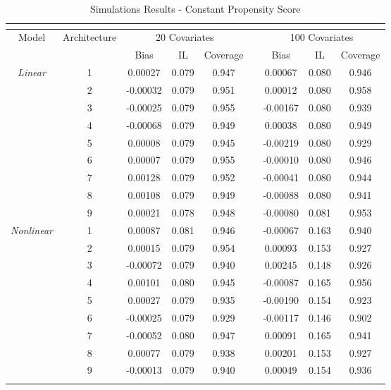 \documentclass[11pt]{article}
\numberwithin{equation}{section}
\theoremstyle{definition}
\begin{document}
\begin{table}[h]
	\begin{centering}
		\caption{Simulations Results - Constant Propensity Score\label{tab:simuls1}}
		~
		\par
	\end{centering}
	\begin{onehalfspace}
		\centering{}%
		\begin{tabular}{ccccccccc}
			\multicolumn{9}{c}{}\tabularnewline
			\hline 
			\hline 
			\multirow{2}{*}{Model} & \multirow{2}{*}{Architecture} & \multicolumn{3}{c}{20 Covariates} &  & \multicolumn{3}{c}{100 Covariates}\tabularnewline
			\cline{3-5} \cline{7-9} 
			 &  & Bias & IL & Coverage &  & Bias & IL & Coverage\tabularnewline
			\hline 
			\multirow{9}{*}{\textit{Linear}}  & 1 & 0.00027 & 0.079 & 0.947 &  & 0.00067 & 0.080 & 0.946\tabularnewline
			 & 2 & -0.00032 & 0.079 & 0.951 &  & 0.00012 & 0.080 & 0.958\tabularnewline
			 & 3 & -0.00025 & 0.079 & 0.955 &  & -0.00167 & 0.080 & 0.939\tabularnewline
			 & 4 & -0.00068 & 0.079 & 0.949 &  & 0.00038 & 0.080 & 0.949\tabularnewline
			 & 5 & 0.00008 & 0.079 & 0.945 &  & -0.00219 & 0.080 & 0.929\tabularnewline
			 & 6 & 0.00007 & 0.079 & 0.955 &  & -0.00010 & 0.080 & 0.946\tabularnewline
			 & 7 & 0.00128 & 0.079 & 0.952 &  & -0.00041 & 0.080 & 0.944\tabularnewline
			 & 8 & 0.00108 & 0.079 & 0.949 &  & -0.00088 & 0.080 & 0.941\tabularnewline
			 & 9 & 0.00021 & 0.078 & 0.948 &  & -0.00080 & 0.081 & 0.953\tabularnewline
			\hline 
			\multirow{9}{*}{\textit{Nonlinear}}  & 1 & 0.00087 & 0.081 & 0.946 &  & -0.00067 & 0.163 & 0.940\tabularnewline
			 & 2 & 0.00015 & 0.079 & 0.954 &  & 0.00093 & 0.153 & 0.927\tabularnewline
			 & 3 & -0.00072 & 0.079 & 0.940 &  & 0.00245 & 0.148 & 0.926\tabularnewline
			 & 4 & 0.00101 & 0.080 & 0.945 &  & -0.00087 & 0.165 & 0.956\tabularnewline
			 & 5 & 0.00027 & 0.079 & 0.935 &  & -0.00190 & 0.154 & 0.923\tabularnewline
			 & 6 & -0.00025 & 0.079 & 0.929 &  & -0.00117 & 0.146 & 0.902\tabularnewline
			 & 7 & -0.00052 & 0.080 & 0.947 &  & 0.00091 & 0.165 & 0.941\tabularnewline
			 & 8 & 0.00077 & 0.079 & 0.938 &  & 0.00201 & 0.153 & 0.927\tabularnewline
			 & 9 & -0.00013 & 0.079 & 0.940 &  & 0.00049 & 0.154 & 0.936\tabularnewline
			\hline 
			\hline 
			\multicolumn{9}{c}{}\tabularnewline
		\end{tabular}
	\end{onehalfspace}
\end{table}
\end{document}
